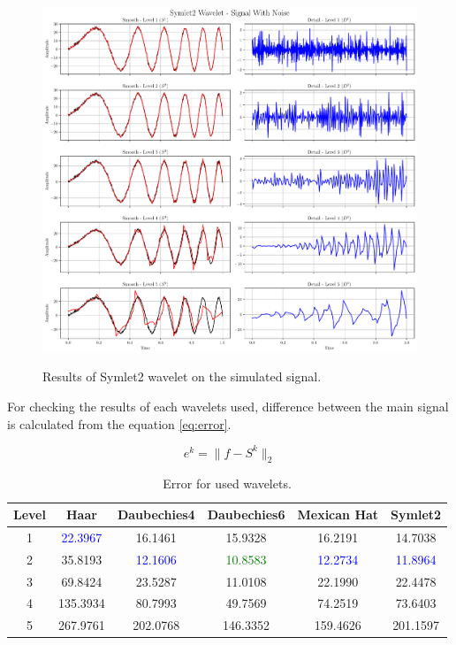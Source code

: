 \documentclass[12pt]{article}
\begin{document}
	\clearpage
	\begin{figure}[!h]
		\centering
		\includegraphics[height=11cm]{../Tests/Outputs/Symlet2Wavelet_SignalWithNoise.pdf}
		\caption{Results of Symlet2 wavelet on the simulated signal.}
		\label{fig:1d_sym2}
	\end{figure}
	
	For checking the results of each wavelets used, difference between the main signal is calculated from the equation \ref{eq:error}.
	
	\begin{equation}
		e^k = \|f-S^k\|_2
		\label{eq:error}
	\end{equation}
	
	\begin{table}[h!]
		\centering
		\caption{Error for used wavelets.}
		\vspace{0.3cm}
		\renewcommand{\arraystretch}{1.4}
		\begin{tabular}{c|c|c|c|c|c}
			\textbf{Level} & \textbf{Haar} & \textbf{Daubechies4} & \textbf{Daubechies6} & \textbf{Mexican Hat} & \textbf{Symlet2} \\
			\hline 
			1 & \textcolor{blue}{22.3967} & 16.1461 & 15.9328 & 16.2191 & 14.7038 \\
			2 & 35.8193 & \textcolor{blue}{12.1606} & \textcolor{green}{10.8583} & \textcolor{blue}{12.2734} & \textcolor{blue}{11.8964} \\
			3 & 69.8424 & 23.5287 & 11.0108 & 22.1990 & 22.4478 \\
			4 & 135.3934 & 80.7993 & 49.7569 & 74.2519 & 73.6403 \\
			5 & 267.9761 & 202.0768 & 146.3352 & 159.4626 & 201.1597 \\
		\end{tabular}
		\label{tab:errors}
	\end{table}
	
\end{document}
